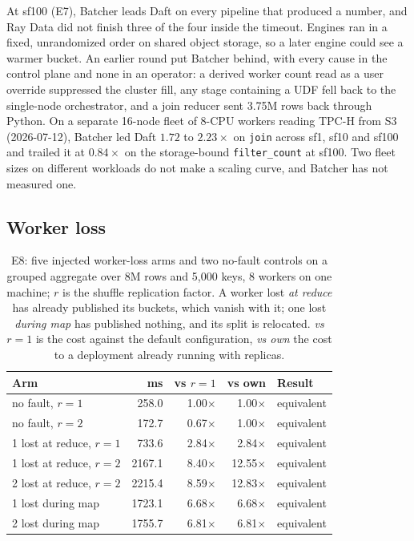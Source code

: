\documentclass[10pt,twocolumn,letterpaper]{article}   %
\newcommand{\sys}{Batcher}
\newcommand{\win}{\cellcolor{okSky!22}}
\newcommand{\loss}{\cellcolor{okOrange!16}}
\newcommand{\E}[1]{\textsf{E#1}}
\begin{document}
At sf100 (\E{7}), \sys{} leads Daft on every pipeline that produced a number, and Ray Data did
not finish three of the four inside the timeout. Engines ran in a fixed, unrandomized order on
shared object storage, so a later engine could see a warmer bucket. An earlier round put \sys{}
behind, with every cause in the control plane and none in an operator: a derived worker count
read as a user override suppressed the cluster fill, any stage containing a UDF fell back to the
single-node orchestrator, and a join reducer sent 3.75M rows back through Python. On a separate 16-node fleet of 8-CPU workers reading TPC-H from S3 (2026-07-12), \sys{}
led Daft $1.72$ to $2.23\times$ on \texttt{join} across sf1, sf10 and sf100 and trailed it at
$0.84\times$ on the storage-bound \texttt{filter\_count} at sf100. Two fleet sizes on different
workloads do not make a scaling curve, and \sys{} has not measured one.

\subsection{Worker loss}
\label{sec:eval-dist}

\begin{table}[tbp]
\centering\footnotesize
\setlength{\tabcolsep}{3.0pt}
\begin{tabular}{@{}lrrrl@{}}
\toprule
Arm & ms & vs $r{=}1$ & vs own & Result \\
\midrule
no fault, $r{=}1$              & 258.0 & 1.00$\times$ & 1.00$\times$ & \win equivalent \\
no fault, $r{=}2$              & 172.7 & 0.67$\times$ & 1.00$\times$ & \win equivalent \\
1 lost at reduce, $r{=}1$      & 733.6 & 2.84$\times$ & 2.84$\times$ & \win equivalent \\
1 lost at reduce, $r{=}2$      & 2167.1 & \loss 8.40$\times$ & \loss 12.55$\times$ & \win equivalent \\
2 lost at reduce, $r{=}2$      & 2215.4 & \loss 8.59$\times$ & \loss 12.83$\times$ & \win equivalent \\
1 lost during map              & 1723.1 & 6.68$\times$ & 6.68$\times$ & \win equivalent \\
2 lost during map              & 1755.7 & 6.81$\times$ & 6.81$\times$ & \win equivalent \\
\bottomrule
\end{tabular}
\caption{\E{8}: five injected worker-loss arms and two no-fault controls on a grouped aggregate
over 8M rows and 5{,}000 keys, 8 workers on one machine; $r$ is the shuffle replication factor.
A worker lost \emph{at reduce} has already published its buckets, which vanish with it; one lost
\emph{during map} has published nothing, and its split is relocated. \emph{vs $r{=}1$} is the cost
against the default configuration, \emph{vs own} the cost to a deployment already running with
replicas.}
\label{tab:faults}
\end{table}
\end{document}
